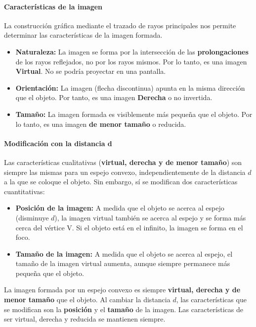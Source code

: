 \paragraph*{Características de la imagen}
La construcción gráfica mediante el trazado de rayos principales nos permite determinar las características de la imagen formada.
\begin{itemize}
    \item \textbf{Naturaleza:} La imagen se forma por la intersección de las \textbf{prolongaciones} de los rayos reflejados, no por los rayos mismos. Por lo tanto, es una imagen \textbf{Virtual}. No se podría proyectar en una pantalla.
    \item \textbf{Orientación:} La imagen (flecha discontinua) apunta en la misma dirección que el objeto. Por tanto, es una imagen \textbf{Derecha} o no invertida.
    \item \textbf{Tamaño:} La imagen formada es visiblemente más pequeña que el objeto. Por lo tanto, es una imagen \textbf{de menor tamaño} o reducida.
\end{itemize}

\paragraph*{Modificación con la distancia d}
Las características cualitativas (\textbf{virtual, derecha y de menor tamaño}) son siempre las mismas para un espejo convexo, independientemente de la distancia $d$ a la que se coloque el objeto. Sin embargo, sí se modifican dos características cuantitativas:
\begin{itemize}
    \item \textbf{Posición de la imagen:} A medida que el objeto se acerca al espejo (disminuye $d$), la imagen virtual también se acerca al espejo y se forma más cerca del vértice V. Si el objeto está en el infinito, la imagen se forma en el foco.
    \item \textbf{Tamaño de la imagen:} A medida que el objeto se acerca al espejo, el tamaño de la imagen virtual aumenta, aunque siempre permanece más pequeña que el objeto.
\end{itemize}

\begin{cajaresultado}
La imagen formada por un espejo convexo es siempre \textbf{virtual, derecha y de menor tamaño} que el objeto.
Al cambiar la distancia $d$, las características que se modifican son la \textbf{posición} y el \textbf{tamaño} de la imagen. Las características de ser virtual, derecha y reducida se mantienen siempre.
\end{cajaresultado}

